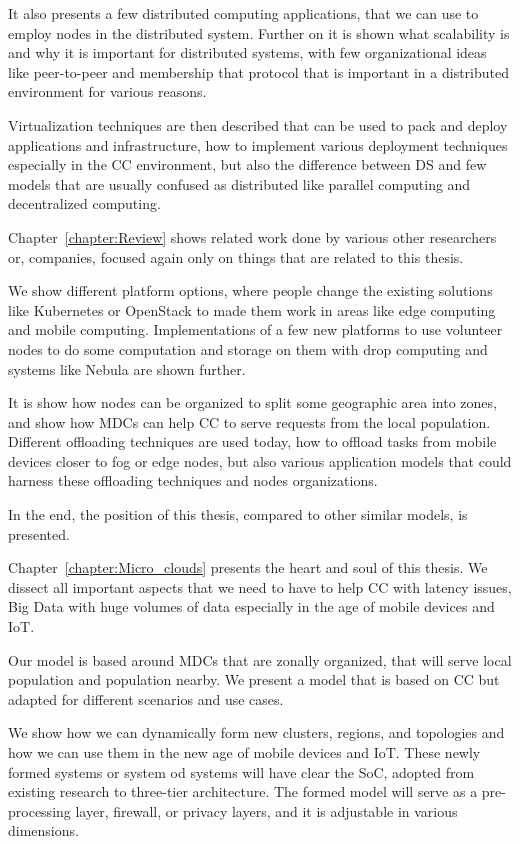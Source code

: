 It also presents a few distributed computing applications, that we can use to employ nodes in the distributed system. Further on it is shown what scalability is and why it is important for distributed systems, with few organizational ideas like peer-to-peer and membership that protocol that is important in a distributed environment for various reasons.

Virtualization techniques are then described that can be used to pack and deploy applications and infrastructure, how to implement various deployment techniques especially in the CC environment, but also the difference between DS and few models that are usually confused as distributed like parallel computing and decentralized computing.

Chapter~\ref{chapter:Review} shows related work done by various other researchers or, companies, focused again only on things that are related to this thesis.

We show different platform options, where people change the existing solutions like Kubernetes or OpenStack to made them work in areas like edge computing and mobile computing. Implementations of a few new platforms to use volunteer nodes to do some computation and storage on them with drop computing and systems like Nebula are shown further.

It is show how nodes can be organized to split some geographic area into zones, and show how MDCs can help CC to serve requests from the local population. Different offloading techniques are used today, how to offload tasks from mobile devices closer to fog or edge nodes, but also various application models that could harness these offloading techniques and nodes organizations.

In the end, the position of this thesis, compared to other similar models, is presented.

Chapter~\ref{chapter:Micro_clouds} presents the heart and soul of this thesis. We dissect all important aspects that we need to have to help CC with latency issues, Big Data with huge volumes of data especially in the age of mobile devices and IoT.

Our model is based around MDCs that are zonally organized, that will serve local population and population nearby. We present a model that is based on CC but adapted for different scenarios and use cases.

We show how we can dynamically form new clusters, regions, and topologies and how we can use them in the new age of mobile devices and IoT. These newly formed systems or system od systems will have clear the SoC, adopted from existing research to three-tier architecture. The formed model will serve as a pre-processing layer, firewall, or privacy layers, and it is adjustable in various dimensions.

